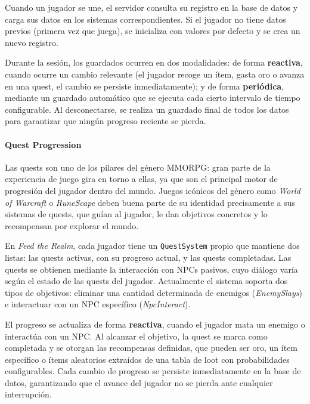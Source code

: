 \vspace{0.25cm}

Cuando un jugador se une, el servidor consulta su registro en la base de datos y carga sus datos en los sistemas correspondientes. Si el
jugador no tiene datos previos (primera vez que juega), se inicializa con valores por defecto y se crea un nuevo registro.

\vspace{0.25cm}

Durante la sesión, los guardados ocurren en dos modalidades: de forma \textbf{reactiva}, cuando ocurre un cambio relevante (el jugador recoge un ítem,
gasta oro o avanza en una quest, el cambio se persiste inmediatamente); y de forma \textbf{periódica}, mediante un guardado automático que se ejecuta
cada cierto intervalo de tiempo configurable. Al desconectarse, se realiza un guardado final de todos los datos para garantizar que ningún
progreso reciente se pierda.

\paragraph{Quest Progression}
Las quests son uno de los pilares del género MMORPG: gran parte de la experiencia de juego gira en torno a ellas, ya que son el principal
motor de progresión del jugador dentro del mundo. Juegos icónicos del género como \textit{World of Warcraft} o \textit{RuneScape} deben buena
parte de su identidad precisamente a sus sistemas de quests, que guían al jugador, le dan objetivos concretos y lo recompensan por explorar el
mundo.

\vspace{0.25cm}

En \textit{Feed the Realm}, cada jugador tiene un \texttt{QuestSystem} propio que mantiene dos listas: las quests activas, con su progreso
actual, y las quests completadas. Las quests se obtienen mediante la interacción con NPCs pasivos, cuyo diálogo varía según el estado de las
quests del jugador. Actualmente el sistema soporta dos tipos de objetivos: eliminar una cantidad determinada de enemigos (\textit{EnemySlays})
e interactuar con un NPC específico (\textit{NpcInteract}). 

\vspace{0.25cm}

El progreso se actualiza de forma \textbf{reactiva}, cuando el jugador mata un enemigo o interactúa con un NPC.
Al alcanzar el objetivo, la quest se marca como completada y se otorgan las recompensas
definidas, que pueden ser oro, un ítem específico o ítems aleatorios extraídos de una tabla de loot con probabilidades configurables. 
Cada cambio de progreso se persiste inmediatamente en la base de datos, garantizando que el avance del jugador no se pierda ante cualquier
interrupción.

